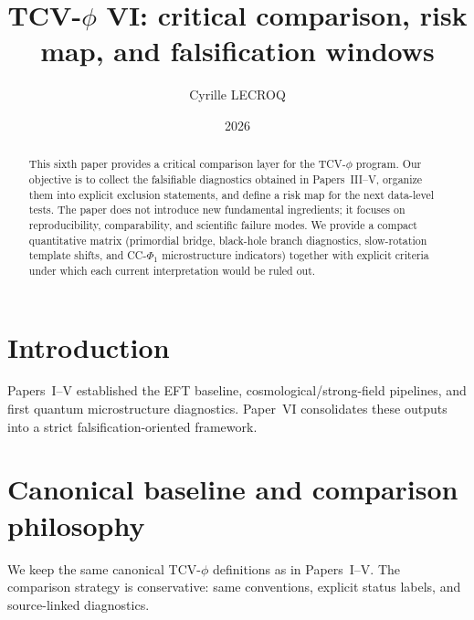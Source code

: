 \documentclass[aps,prd,onecolumn,nofootinbib,superscriptaddress]{revtex4-2}
\begin{document}
\title{TCV-$\phi$ VI: critical comparison, risk map, and falsification windows}

\author{Cyrille LECROQ}

\date{2026}

\begin{abstract}
This sixth paper provides a critical comparison layer for the TCV-$\phi$ program.
Our objective is to collect the falsifiable diagnostics obtained in Papers~III--V, organize them into explicit exclusion statements, and define a risk map for the next data-level tests.
The paper does not introduce new fundamental ingredients; it focuses on reproducibility, comparability, and scientific failure modes.
We provide a compact quantitative matrix (primordial bridge, black-hole branch diagnostics, slow-rotation template shifts, and CC-$\Phi_1$ microstructure indicators) together with explicit criteria under which each current interpretation would be ruled out.
\end{abstract}

\maketitle

\section{Introduction}
Papers~I--V established the EFT baseline, cosmological/strong-field pipelines, and first quantum microstructure diagnostics.
Paper~VI consolidates these outputs into a strict falsification-oriented framework.

\section{Canonical baseline and comparison philosophy}
We keep the same canonical TCV-$\phi$ definitions as in Papers~I--V.
The comparison strategy is conservative: same conventions, explicit status labels, and source-linked diagnostics.
\end{document}
